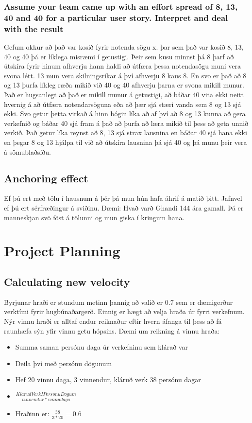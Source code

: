 \documentclass[openany]{article}
\begin{document}
\subsubsection{Assume your team came up with an effort spread of 8, 13, 40 and 40 for a particular user story. Interpret and deal with the result}
Gefum okkur að það var kosið fyrir notenda sögu x. þar sem það var kosið 8, 13, 40 og 40 þá er líklega misræmi í getustigi. Þeir sem kusu minnst þá 8 þarf 
að útskíra fyrir hinum afhverju hann haldi að útfæra þessa notendasögu muni vera svona létt. 13 mun vera skilningsríkar á því afhverju 8 kaus 8. En svo er það að 8 og 13 þurfa líkleg ræða mikið við 40 og 40 afhverju þarna er svona mikill munur. Það er hugsanlegt að það er mikill munur á getustigi, að báðar 40 vita ekki neitt hvernig á að útfæra notendarsöguna eða að þær sjá stæri vanda sem 8 og 13 sjá ekki. Svo getur þetta virkað á hinn bógin líka að af því að 8 og 13 kunna að gera verkefnið og báðar 40 sjá fram á það að þurfa að læra mikið til þess að geta unnið verkið. Það getur líka reynst að 8, 13 sjá strax lausnina en báðar 40 sjá hana ekki en þegar 8 og 13 hjálpa til við að útskíra lausnina þá sjá 40 og þá munu þeir vera á sömublaðsíðu.


\subsection{Anchoring effect}
Ef þú ert með tölu í hausnum á þér þá mun hún hafa áhrif á matið þitt. Jafnvel ef þú ert sérfræðingur á sviðinu. Dæmi: Hvað varð Ghandi 144 ára gamall. Þá er manneskjan svö föst á tölunni og mun giska í kringum hana.

\section{Project Planning}
\subsection{Calculating new velocity}
Byrjunar hraði er stundum metinn þannig að valið er 0.7 sem er dæmigerður verktími fyrir hugbúnaðargerð. Einnig er hægt að velja hraða úr fyrri verkefnum. Nýr vinnu hraði er alltaf endur reiknaður eftir hvern áfanga til þess að fá raunhæfa sýn yfir vinnu getu hópsins. Dæmi um reikning á vinnu hraða:
\begin{itemize}
	\item Summa saman persónu daga úr verkefninu sem klárað var
	\item Deila því með persónu dögunum
	\item Hef 20 vinnu daga, 3 vinnendur, kláruð verk 38 persónu dagar
	\item $\frac{KlarudVerkIPersonuDogum}{vinnendur * vinnudaga}$
	\item Hraðinn er: $\frac{38}{3 * 20} = 0.6$ 
\end{itemize}
\end{document}
